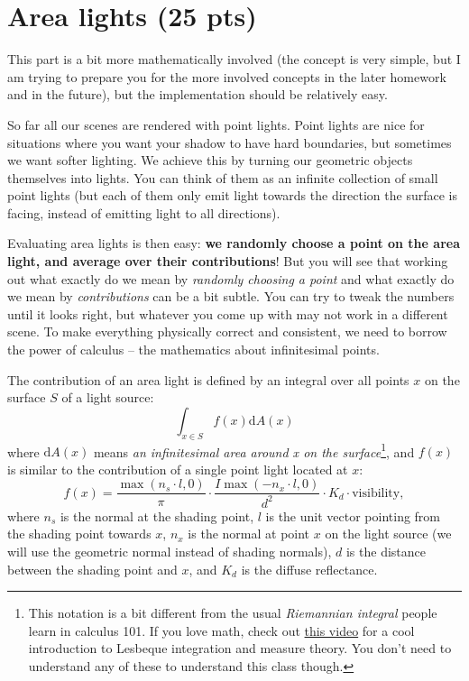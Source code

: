 \section{Area lights (25 pts)}
This part is a bit more mathematically involved (the concept is very simple, but I am trying to prepare you for the more involved concepts in the later homework and in the future), but the implementation should be relatively easy.

So far all our scenes are rendered with point lights. Point lights are nice for situations where you want your shadow to have hard boundaries, but sometimes we want softer lighting. We achieve this by turning our geometric objects themselves into lights. You can think of them as an infinite collection of small point lights (but each of them only emit light towards the direction the surface is facing, instead of emitting light to all directions).

Evaluating area lights is then easy: \textbf{we randomly choose a point on the area light, and average over their contributions}! But you will see that working out what exactly do we mean by \emph{randomly choosing a point} and what exactly do we mean by \emph{contributions} can be a bit subtle. You can try to tweak the numbers until it looks right, but whatever you come up with may not work in a different scene. To make everything physically correct and consistent, we need to borrow the power of calculus -- the mathematics about infinitesimal points.

The contribution of an area light is defined by an integral over all points $x$ on the surface $S$ of a light source:
\begin{equation}
    \int_{x \in S} f(x) \mathrm{d}A(x)
    \label{eq:area_light_integral}
\end{equation}
where $\mathrm{d}A(x)$ means \emph{an infinitesimal area around x on the surface}\footnote{This notation is a bit different from the usual \emph{Riemannian integral} people learn in calculus 101. If you love math, check out \href{https://www.youtube.com/watch?v=LDNDTOVnKJk}{this video} for a cool introduction to Lesbeque integration and measure theory. You don't need to understand any of these to understand this class though.}, and $f(x)$ is similar to the contribution of a single point light located at $x$:
\begin{equation}
    f(x) = \frac{\max\left(n_s \cdot l, 0\right)}{\pi} \cdot \frac{I \max\left(-n_x \cdot l, 0\right)}{d^2} \cdot K_d \cdot \text{visibility},
    \label{eq:area_light_integrand}
\end{equation}
where $n_s$ is the normal at the shading point, $l$ is the unit vector pointing from the shading point towards $x$, $n_x$ is the normal at point $x$ on the light source (we will use the geometric normal instead of shading normals), $d$ is the distance between the shading point and $x$, and $K_d$ is the diffuse reflectance.

